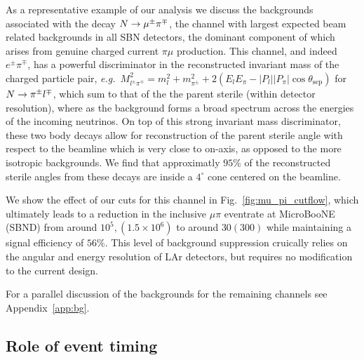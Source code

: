 \documentclass[11pt, a4paper]{article}
\newcommand{\reffig}[1]{Fig.~\ref{#1}}
\newcommand{\refapp}[1]{Appendix~\ref{#1}}
\def\eg{\emph{e.g.}}
\def\ster{\ensuremath N}
\begin{document}
As a representative example of our analysis we discuss the backgrounds
associated with the decay $\ster \rightarrow \mu^\pm \pi^\mp$, the channel with
largest expected beam related backgrounds in all SBN detectors, the dominant
component of which arises from genuine charged current $\pi \mu$ production.
This channel, and indeed $e^\pm \pi^\mp$, has a powerful discriminator in the
reconstructed invariant mass of the charged particle pair, \eg\  $M_{l^\pm
\pi^\mp}^2=m_l^2+m_{\pi^\pm}^2+ 2(E_l E_\pi - |P_l||P_\pi|\cos\theta_\text{sep})$
for $\ster\rightarrow \pi^\pm l^\mp$, which sum to that of the the parent
sterile (within detector resolution), where as the background forms
a broad spectrum across the energies of the incoming neutrinos. On top of this strong invariant mass discriminator, these two body decays allow for reconstruction of the 
parent sterile angle with respect to the beamline which is very
close to on-axis, as opposed to the more isotropic backgrounds. We find that
approximatly $95$\% of the reconstructed sterile angles from these
decays are inside a $4^\circ$ cone centered on the beamline. 

We show the effect of our cuts for this channel in \reffig{fig:mu_pi_cutflow},
which ultimately leads to a reduction in the inclusive $\mu \pi$ eventrate at
MicroBooNE (SBND) from around $10^5, (1.5\times10^6)$ to around $30 (300)$
while maintaining a signal efficiency of $56\%$. This level of background
suppression cruically relies on the angular and energy resolution of LAr
detectors, but requires no modification to the current design. 

For a parallel discussion of the backgrounds for the remaining channels see
\refapp{app:bg}.

\subsection{\label{sec:timing}Role of event timing}
\end{document}
